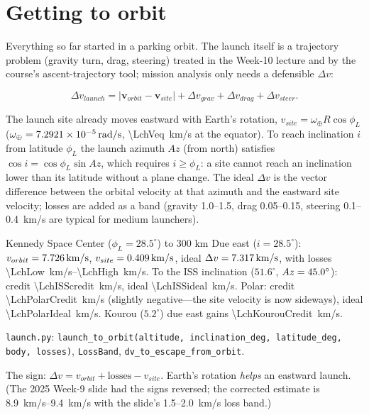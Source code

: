 \documentclass[11pt,letterpaper,oneside]{report}
\newcommand{\dv}{\Delta v}
\newcommand{\code}[1]{\texttt{#1}}
\newcommand{\bv}[1]{\bm{#1}}
\begin{document}
\chapter{Getting to orbit}\label{ch:launch}
Everything so far started in a parking orbit. The launch itself is a trajectory problem (gravity
turn, drag, steering) treated in the Week-10 lecture and by the course's ascent-trajectory tool;
mission analysis only needs a defensible $\dv$:
\begin{keyresult}
\begin{equation}
  \dv_{launch}=\big|\bv v_{orbit}-\bv v_{site}\big|+\dv_{grav}+\dv_{drag}+\dv_{steer}.
\end{equation}
\end{keyresult}
The launch site already moves eastward with Earth's rotation,
$v_{site}=\omega_\oplus R\cos\phi_L$ ($\omega_\oplus=\SI{7.2921e-05}{rad/s}$, \SI{\LchVeq}{km/s}
at the equator). To reach inclination $i$ from latitude $\phi_L$ the launch azimuth $Az$ (from
north) satisfies $\cos i=\cos\phi_L\sin Az$, which requires $i\ge\phi_L$: a site cannot reach an
inclination lower than its latitude without a plane change. The ideal $\dv$ is the vector
difference between the orbital velocity at that azimuth and the eastward site velocity; losses
are added as a band (gravity 1.0--1.5, drag 0.05--0.15, steering 0.1--0.4~km/s are typical for
medium launchers).

\begin{worked}{Kennedy Space Center ($\phi_L=28.5^\circ$) to 300 km}
Due east ($i=28.5^\circ$): $v_{orbit}=\SI{7.726}{km/s}$, $v_{site}=\SI{0.409}{km/s}$,
ideal $\dv=\SI{\LchIdeal}{km/s}$, with losses \SIrange{\LchLow}{\LchHigh}{km/s}.
To the ISS inclination ($51.6^\circ$, $Az=\SI{45.0}{\degree}$): credit \SI{\LchISScredit}{km/s},
ideal \SI{\LchISSideal}{km/s}. Polar: credit \SI{\LchPolarCredit}{km/s} (slightly negative---the
site velocity is now sideways), ideal \SI{\LchPolarIdeal}{km/s}. Kourou ($5.2^\circ$) due east
gains \SI{\LchKourouCredit}{km/s}.
\end{worked}

\begin{codebox}
\code{launch.py}: \code{launch\_to\_orbit(altitude, inclination\_deg, latitude\_deg, body, losses)},
\code{LossBand}, \code{dv\_to\_escape\_from\_orbit}.
\end{codebox}

\begin{pitfall}
The sign: $\dv=v_{orbit}+\text{losses}-v_{site}$. Earth's rotation \emph{helps} an eastward launch.
(The 2025 Week-9 slide had the signs reversed; the corrected estimate is \SIrange{8.9}{9.4}{km/s}
with the slide's 1.5--2.0~km/s loss band.)
\end{pitfall}
\end{document}
